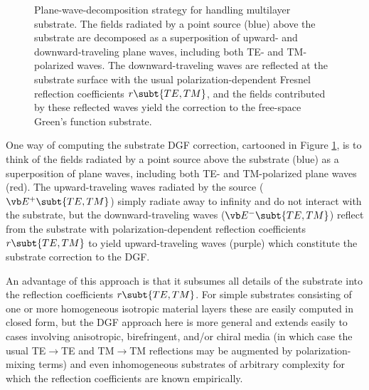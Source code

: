 \documentclass[letterpaper]{article}
\begin{document}
\begin{figure}
\begin{center}
\caption{Plane-wave-decomposition strategy for handling 
multilayer substrate. The fields radiated by a point source (blue)
above the substrate are decomposed as a superposition of
upward- and downward-traveling plane waves, including 
both TE- and TM-polarized waves. The downward-traveling waves
are reflected at the substrate surface with the usual
polarization-dependent Fresnel reflection coefficients $r\subt{TE,TM}$,
and the fields contributed by these reflected waves
yield the correction to the free-space Green's function
substrate.
}
\label{PlaneWaveFigure}
\end{center}
\end{figure}

One way of computing the substrate DGF 
correction, cartooned in Figure \ref{PlaneWaveFigure}, is
to think of the fields radiated by a point source above
the substrate (blue) as a superposition of 
plane waves, including both TE- and TM-polarized
plane waves (red). The upward-traveling waves radiated by the 
source ($\vb E^+\subt{TE,TM}$) simply radiate away to 
infinity and do not interact with the substrate, but the
downward-traveling waves
($\vb E^-\subt{TE,TM}$) reflect from the substrate 
with polarization-dependent reflection coefficients
$r\subt{TE,TM}$ to yield upward-traveling waves (purple)
which constitute the substrate correction to the DGF.

An advantage of this approach is that it subsumes all details
of the substrate into the reflection coefficients $r\subt{TE,TM}$.
For simple substrates consisting of one or more homogeneous
isotropic material layers these are easily computed in closed
form, but the DGF approach here is more general and extends
easily to cases involving anisotropic, birefringent, and/or
chiral media (in which case the usual TE$\to$TE and TM$\to$TM
reflections may be augmented by polarization-mixing terms) and 
even inhomogeneous substrates of arbitrary complexity for which
the reflection coefficients are known empirically.

\end{document}
